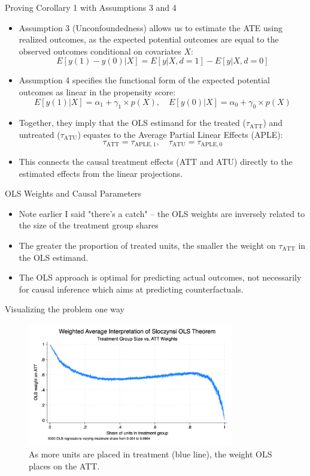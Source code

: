 \documentclass{beamer}
\begin{document}
\begin{frame}{Proving Corollary 1 with Assumptions 3 and 4}
  \begin{itemize}
    \item Assumption 3 (Unconfoundedness) allows us to estimate the ATE using realized outcomes, as the expected potential outcomes are equal to the observed outcomes conditional on covariates \( X \):
    \[ E[y(1) - y(0) | X] = E[y | X, d = 1] - E[y | X, d = 0] \]
    \item Assumption 4 specifies the functional form of the expected potential outcomes as linear in the propensity score:
    \[ E[y(1) | X] = \alpha_1 + \gamma_1 \times p(X), \quad E[y(0) | X] = \alpha_0 + \gamma_0 \times p(X) \]
    \item Together, they imply that the OLS estimand for the treated (\( \tau_{\text{ATT}} \)) and untreated (\( \tau_{\text{ATU}} \)) equates to the Average Partial Linear Effects (APLE):
    \[ \tau_{\text{ATT}} = \tau_{\text{APLE},1}, \quad \tau_{\text{ATU}} = \tau_{\text{APLE},0} \]
    \item This connects the causal treatment effects (ATT and ATU) directly to the estimated effects from the linear projections.
  \end{itemize}
\end{frame}


\begin{frame}{OLS Weights and Causal Parameters}
  \begin{itemize}
  \item Note earlier I said "there's a catch" -- the OLS weights are inversely related to the size of the treatment group shares
    \item The greater the proportion of treated units, the smaller the weight on \( \tau_{\text{ATT}} \) in the OLS estimand.
    \item The OLS approach is optimal for predicting actual outcomes, not necessarily for causal inference which aims at predicting counterfactuals.
  \end{itemize}
\end{frame}



\begin{frame}{Visualizing the problem one way}
    \begin{figure}
        \centering
        \includegraphics[width=0.8\textwidth]{./lecture_includes/tymon_weights_crossing}
        \caption{As more units are placed in treatment (blue line), the weight OLS places on the ATT.}
    \end{figure}
\end{frame}
\end{document}
